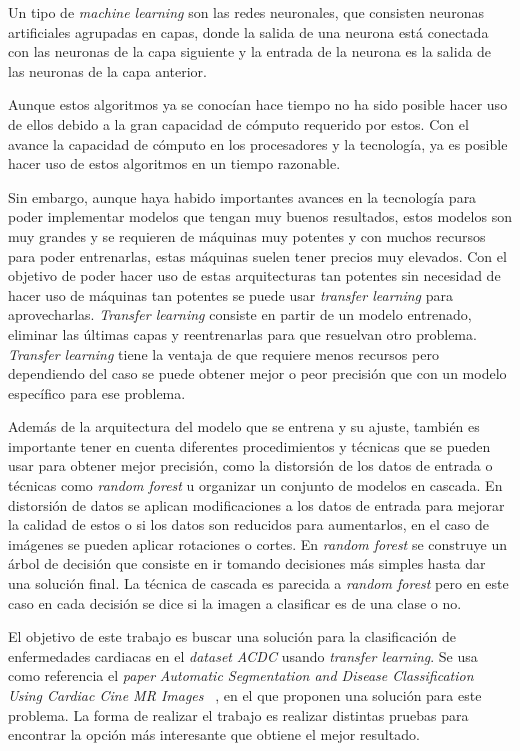 \documentclass[12pt,a4paper]{article}
\begin{document}
Un tipo de \textit{machine learning} son las redes neuronales, que consisten neuronas artificiales agrupadas en capas, donde la salida de una neurona está conectada con las neuronas de la capa siguiente y la entrada de la neurona es la salida de las neuronas de la capa anterior.
\bigskip

Aunque estos algoritmos ya se conocían hace tiempo no ha sido posible hacer uso de ellos debido a la gran capacidad de cómputo requerido por estos. Con el avance la capacidad de cómputo en los procesadores y la tecnología, ya es posible hacer uso de estos algoritmos en un tiempo razonable.
\bigskip

Sin embargo, aunque haya habido importantes avances en la tecnología para poder implementar modelos que tengan muy buenos resultados, estos modelos son muy grandes y se requieren de máquinas muy potentes y con muchos recursos para poder entrenarlas, estas máquinas suelen tener precios muy elevados. Con el objetivo de poder hacer uso de estas arquitecturas tan potentes sin necesidad de hacer uso de máquinas tan potentes se puede usar \textit{transfer learning} para aprovecharlas. \textit{Transfer learning} consiste en partir de un modelo entrenado, eliminar las últimas capas y reentrenarlas para que resuelvan otro problema. \textit{Transfer learning} tiene la ventaja de que requiere menos recursos pero dependiendo del caso se puede obtener mejor o peor precisión que con un modelo específico para ese problema. 
\bigskip

Además de la arquitectura del modelo que se entrena y su ajuste, también es importante tener en cuenta diferentes procedimientos y técnicas que se pueden usar para obtener mejor precisión, como la distorsión de los datos de entrada o técnicas como \textit{random forest} u organizar un conjunto de modelos en cascada. En distorsión de datos se aplican modificaciones a los datos de entrada para mejorar la calidad de estos o si los datos son reducidos para aumentarlos, en el caso de imágenes se pueden aplicar rotaciones o cortes. En \textit{random forest} se construye un árbol de decisión que consiste en ir tomando decisiones más simples hasta dar una solución final. La técnica de cascada es parecida a \textit{random forest} pero en este caso en cada decisión se dice si la imagen a clasificar es de una clase o no.
\bigskip

El objetivo de este trabajo es buscar una solución para la clasificación de enfermedades cardiacas en el \textit{dataset} \textit{ACDC} usando \textit{transfer learning}. Se usa como referencia el \textit{paper}  \textit{Automatic Segmentation and Disease Classification Using Cardiac Cine MR Images} ~\cite{DBLP:journals/corr/abs-1708-01141}, en el que proponen una solución para este problema. La forma de realizar el trabajo es realizar distintas pruebas para encontrar la opción más interesante que obtiene el mejor resultado.
\bigskip
\end{document}
